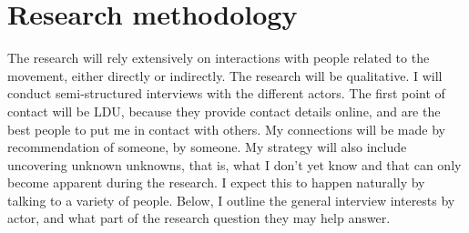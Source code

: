 \documentclass{article}[12pt]
\begin{document}
\section{Research methodology}

The research will rely extensively on interactions with people related to the movement, either directly or indirectly.
The research will be qualitative. I will conduct semi-structured interviews with the different actors. The first point of contact will be LDU, because they provide contact details online, and are the best people to put me in contact with others. My connections will be made by recommendation of someone, by someone. 
My strategy will also include uncovering unknown unknowns, that is, what I don't yet know and that can only become apparent during the research. I expect this to happen naturally by talking to a variety of people. Below, I outline the general interview interests by actor, and what part of the research question they may help answer.
\end{document}
